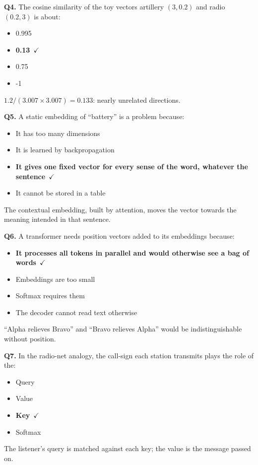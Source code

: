 \documentclass[11pt]{article}
\begin{document}
{\noindent\textbf{Q4.} The cosine similarity of the toy vectors artillery $(3,0.2)$ and radio $(0.2,3)$ is about:\begin{itemize}[leftmargin=2.2em,itemsep=0pt,topsep=1pt]\item[A.] 0.995\item[\textbf{B.}] \textbf{0.13}~{\color{GrnN}$\checkmark$}\item[C.] 0.75\item[D.] -1\end{itemize} $1.2/(3.007\times3.007)=0.133$: nearly unrelated directions.\par\medskip

\noindent\textbf{Q5.} A static embedding of ``battery'' is a problem because:\begin{itemize}[leftmargin=2.2em,itemsep=0pt,topsep=1pt]\item[A.] It has too many dimensions\item[B.] It is learned by backpropagation\item[\textbf{C.}] \textbf{It gives one fixed vector for every sense of the word, whatever the sentence}~{\color{GrnN}$\checkmark$}\item[D.] It cannot be stored in a table\end{itemize} The contextual embedding, built by attention, moves the vector towards the meaning intended in that sentence.\par\medskip

\noindent\textbf{Q6.} A transformer needs position vectors added to its embeddings because:\begin{itemize}[leftmargin=2.2em,itemsep=0pt,topsep=1pt]\item[\textbf{A.}] \textbf{It processes all tokens in parallel and would otherwise see a bag of words}~{\color{GrnN}$\checkmark$}\item[B.] Embeddings are too small\item[C.] Softmax requires them\item[D.] The decoder cannot read text otherwise\end{itemize} ``Alpha relieves Bravo'' and ``Bravo relieves Alpha'' would be indistinguishable without position.\par\medskip

\noindent\textbf{Q7.} In the radio-net analogy, the call-sign each station transmits plays the role of the:\begin{itemize}[leftmargin=2.2em,itemsep=0pt,topsep=1pt]\item[A.] Query\item[B.] Value\item[\textbf{C.}] \textbf{Key}~{\color{GrnN}$\checkmark$}\item[D.] Softmax\end{itemize} The listener's query is matched against each key; the value is the message passed on.\par\medskip

}
\end{document}
